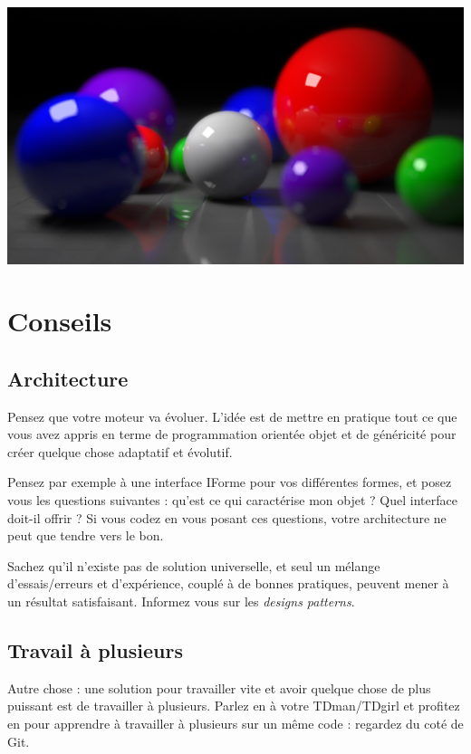 \documentclass[a4paper, 11pt]{article}
\begin{document}
\begin{center}
\includegraphics[scale=0.25]{1280px-BallsRender.png}  
\end{center}

\newpage
\section*{Conseils}  
\subsection{Architecture}  
  
Pensez que votre moteur va évoluer. L'idée est de mettre en pratique tout ce que vous avez appris en terme de programmation orientée objet et de généricité pour créer quelque chose adaptatif et évolutif.   
  
Pensez par exemple à une interface IForme pour vos différentes formes, et posez vous les questions suivantes : qu'est ce qui caractérise mon objet ? Quel interface doit-il offrir ? Si vous codez en vous posant ces questions, votre architecture ne peut que tendre vers le bon.  
  
Sachez qu'il n'existe pas de solution universelle, et seul un mélange d'essais/erreurs et d'expérience, couplé à de bonnes pratiques, peuvent mener à un résultat satisfaisant. Informez vous sur les \textit{designs patterns}.  

\subsection{Travail à plusieurs}
Autre chose : une solution pour travailler vite et avoir quelque chose de plus puissant est de travailler à plusieurs. Parlez en à votre TDman/TDgirl et profitez en pour apprendre à travailler à plusieurs sur un même code : regardez du coté de Git.
\end{document}
